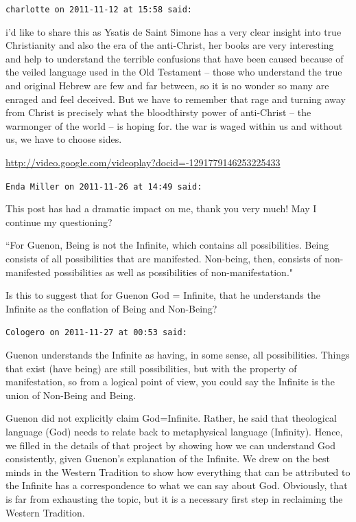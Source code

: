 \begin{footnotesize}
\begin{sffamily}
\hfill

\texttt{charlotte on 2011-11-12 at 15:58 said: }

i'd like to share this as Ysatis de Saint Simone has a very clear insight into true Christianity and also the era of the anti-Christ, her books are very interesting and help to understand the terrible confusions that have been caused because of the veiled language used in the Old Testament – those who understand the true and original Hebrew are few and far between, so it is no wonder so many are enraged and feel deceived. But we have to remember that rage and turning away from Christ is precisely what the bloodthirsty power of anti-Christ – the warmonger of the world – is hoping for. the war is waged within us and without us, we have to choose sides.

\url{http://video.google.com/videoplay?docid=-1291779146253225433}


\hfill

\texttt{Enda Miller on 2011-11-26 at 14:49 said: }

This post has had a dramatic impact on me, thank you very much! May I continue my questioning?

``For Guenon, Being is not the Infinite, which contains all possibilities. Being consists of all possibilities that are manifested. Non-being, then, consists of non-manifested possibilities as well as possibilities of non-manifestation."

Is this to suggest that for Guenon God = Infinite, that he understands the Infinite as the conflation of Being and Non-Being?


\hfill

\texttt{Cologero on 2011-11-27 at 00:53 said: }

Guenon understands the Infinite as having, in some sense, all possibilities. Things that exist (have being) are still possibilities, but with the property of manifestation, so from a logical point of view, you could say the Infinite is the union of Non-Being and Being.

Guenon did not explicitly claim God=Infinite. Rather, he said that theological language (God) needs to relate back to metaphysical language (Infinity). Hence, we filled in the details of that project by showing how we can understand God consistently, given Guenon's explanation of the Infinite. We drew on the best minds in the Western Tradition to show how everything that can be attributed to the Infinite has a correspondence to what we can say about God. Obviously, that is far from exhausting the topic, but it is a necessary first step in reclaiming the Western Tradition.



\end{sffamily}
\end{footnotesize}
